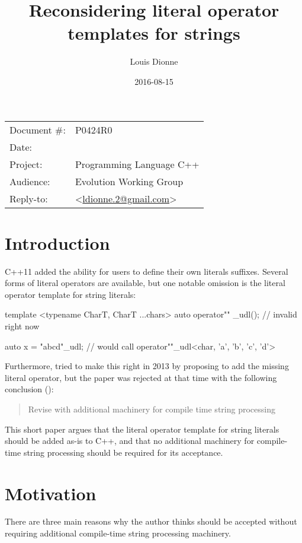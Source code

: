 \documentclass[11pt]{article}
\date{}
\title{Reconsidering literal operator templates for strings}
\author{}
\begin{document}
\maketitle\vspace{-2cm}

\begin{flushright}
  \begin{tabular}{ll}
  Document \#:&P0424R0\\
  Date:       &\date{2016-08-15}\\
  Project:    &Programming Language C++\\
  Audience:   &Evolution Working Group\\
  Reply-to:   &\author{Louis Dionne} \textless\href{mailto:ldionne.2@gmail.com}{ldionne.2@gmail.com}\textgreater
  \end{tabular}
\end{flushright}


\section{Introduction}
C++11 added the ability for users to define their own literals suffixes.
Several forms of literal operators are available, but one notable omission
is the literal operator template for string literals:

\begin{cpp}
template <typename CharT, CharT ...chars>
auto operator"" _udl(); // invalid right now

auto x = "abcd"_udl; // would call operator""_udl<char, 'a', 'b', 'c', 'd'>
\end{cpp}

Furthermore, \cite{N3599} tried to make this right in 2013 by proposing to add
the missing literal operator, but the paper was rejected at that time with
the following conclusion (\cite{CWG66}):

\begin{quote}
  Revise with additional machinery for compile time string processing
\end{quote}

This short paper argues that the literal operator template for string
literals should be added as-is to C++, and that no additional machinery
for compile-time string processing should be required for its acceptance.


\section{Motivation}
There are three main reasons why the author thinks \cite{N3599} should be
accepted without requiring additional compile-time string processing machinery.
\end{document}
